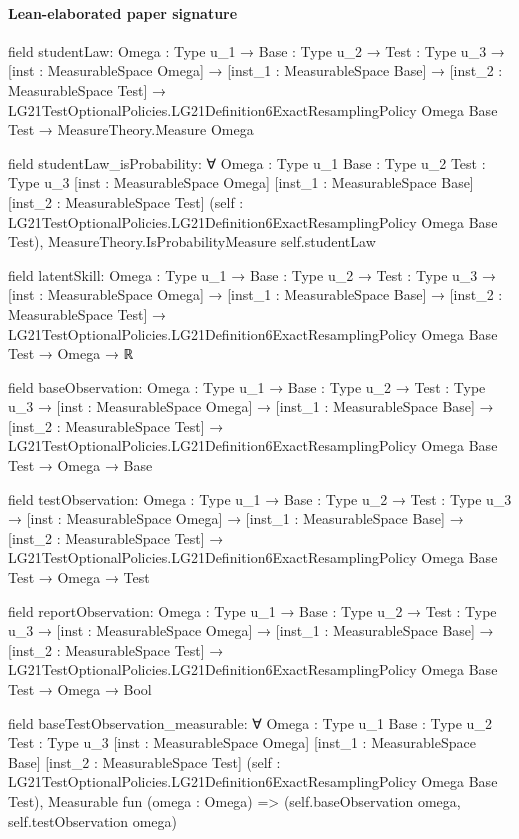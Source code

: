 \documentclass[10pt]{article}
\begin{document}
\paragraph{Lean-elaborated paper signature}
\begin{ReviewVerbatim}
field studentLaw:
{Omega : Type u_1} →
  {Base : Type u_2} →
    {Test : Type u_3} →
      [inst : MeasurableSpace Omega] →
        [inst_1 : MeasurableSpace Base] →
          [inst_2 : MeasurableSpace Test] →
            LG21TestOptionalPolicies.LG21Definition6ExactResamplingPolicy Omega Base Test → MeasureTheory.Measure Omega

field studentLaw_isProbability:
∀ {Omega : Type u_1} {Base : Type u_2} {Test : Type u_3} [inst : MeasurableSpace Omega] [inst_1 : MeasurableSpace Base]
  [inst_2 : MeasurableSpace Test]
  (self : LG21TestOptionalPolicies.LG21Definition6ExactResamplingPolicy Omega Base Test),
  MeasureTheory.IsProbabilityMeasure self.studentLaw

field latentSkill:
{Omega : Type u_1} →
  {Base : Type u_2} →
    {Test : Type u_3} →
      [inst : MeasurableSpace Omega] →
        [inst_1 : MeasurableSpace Base] →
          [inst_2 : MeasurableSpace Test] →
            LG21TestOptionalPolicies.LG21Definition6ExactResamplingPolicy Omega Base Test → Omega → ℝ

field baseObservation:
{Omega : Type u_1} →
  {Base : Type u_2} →
    {Test : Type u_3} →
      [inst : MeasurableSpace Omega] →
        [inst_1 : MeasurableSpace Base] →
          [inst_2 : MeasurableSpace Test] →
            LG21TestOptionalPolicies.LG21Definition6ExactResamplingPolicy Omega Base Test → Omega → Base

field testObservation:
{Omega : Type u_1} →
  {Base : Type u_2} →
    {Test : Type u_3} →
      [inst : MeasurableSpace Omega] →
        [inst_1 : MeasurableSpace Base] →
          [inst_2 : MeasurableSpace Test] →
            LG21TestOptionalPolicies.LG21Definition6ExactResamplingPolicy Omega Base Test → Omega → Test

field reportObservation:
{Omega : Type u_1} →
  {Base : Type u_2} →
    {Test : Type u_3} →
      [inst : MeasurableSpace Omega] →
        [inst_1 : MeasurableSpace Base] →
          [inst_2 : MeasurableSpace Test] →
            LG21TestOptionalPolicies.LG21Definition6ExactResamplingPolicy Omega Base Test → Omega → Bool

field baseTestObservation_measurable:
∀ {Omega : Type u_1} {Base : Type u_2} {Test : Type u_3} [inst : MeasurableSpace Omega] [inst_1 : MeasurableSpace Base]
  [inst_2 : MeasurableSpace Test]
  (self : LG21TestOptionalPolicies.LG21Definition6ExactResamplingPolicy Omega Base Test),
  Measurable fun (omega : Omega) => (self.baseObservation omega, self.testObservation omega)


\end{ReviewVerbatim}
\end{document}
